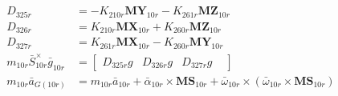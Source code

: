 \begin{align}
 \nonumber \\ 
D_{325r} &= - K_{210r}\mathbf{MY}_{10r} - K_{261r}\mathbf{MZ}_{10r} \nonumber \\
D_{326r} &= K_{210r}\mathbf{MX}_{10r} + K_{260r}\mathbf{MZ}_{10r} \nonumber \\
D_{327r} &= K_{261r}\mathbf{MX}_{10r} - K_{260r}\mathbf{MY}_{10r} \nonumber \\
 m_{10r}\bar{S}_{10r}^{\times}\bar{g}_{10r} &= \left[\begin{matrix} D_{325r}g & D_{326r}g & D_{327r}g &  \end{matrix}\right] 
 \nonumber \\ 
 m_{10r}\bar{a}_{G(10r)} &= m_{10r}\bar{a}_{10r} + \bar\alpha_{10r} \times \mathbf{MS}_{10r} + \bar\omega_{10r} \times \left(\bar\omega_{10r} \times \mathbf{MS}_{10r}\right) 
 \nonumber \\ 

\end{align}

